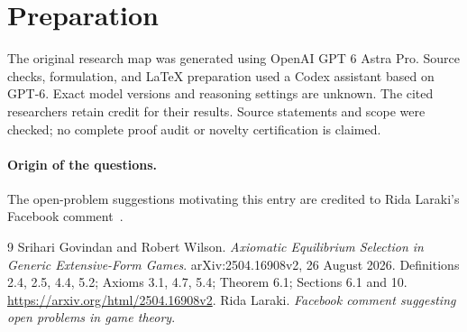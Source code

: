 \documentclass[11pt]{article}
\begin{document}
\section*{Preparation}
The original research map was generated using OpenAI GPT 6 Astra Pro.
Source checks, formulation, and LaTeX preparation used a Codex assistant
based on GPT-6. Exact model versions and reasoning settings are unknown.
The cited researchers retain credit for their results. Source statements
and scope were checked; no complete proof audit or novelty certification
is claimed.
\paragraph{Origin of the questions.}
The open-problem suggestions motivating this entry are credited to
Rida Laraki's Facebook comment~\cite{laraki-facebook}.
\begin{thebibliography}{9}
Srihari Govindan and Robert Wilson.
\emph{Axiomatic Equilibrium Selection in Generic Extensive-Form Games}.
arXiv:2504.16908v2, 26 August 2026.
Definitions 2.4, 2.5, 4.4, 5.2; Axioms 3.1, 4.7, 5.4; Theorem 6.1; Sections 6.1 and 10.
\url{https://arxiv.org/html/2504.16908v2}.
Rida Laraki.
\emph{Facebook comment suggesting open problems in game theory}.
\end{thebibliography}
\end{document}
